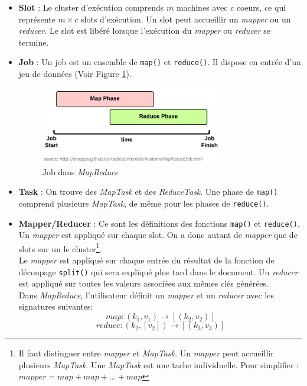 \begin{itemize}
\item {\bf Slot} : Le cluster d'exécution comprends $m$ machines avec $c$ coeurs, ce qui représente $m\times c$ slots d'exécution.
Un slot peut accueillir un {\it mapper} ou un {\it reducer}. Le slot est libéré lorsque l'exécution du {\it mapper} ou {\it reducer} se termine.
\item {\bf Job}  : Un job est un ensemble de {\tt map()} et {\tt reduce()}. Il dispose en entrée d'un jeu de données (Voir Figure \ref{fig:job}).
\begin{figure}[H]
  \centering
    \includegraphics[width=0.75\textwidth]{images/job_timeline.png} 
        \caption{Job dans {\it MapReduce}}
    
\label{fig:job}
\end{figure}
\item {\bf Task} : On trouve des {\it MapTask} et des {\it ReduceTask}. Une phase de {\tt map()} comprend plusieurs {\it MapTask}, de même pour les phases de {\tt reduce()}.

\item {\bf Mapper/Reducer} : Ce sont les définitions des fonctions {\tt map()} et {\tt reduce()}. Un {\it mapper} est appliqué sur chaque slot. On a donc autant de {\it mapper} que de slots sur un le cluster\footnote{Il faut distinguer entre {\it mapper} et {\it MapTask}. Un {\it mapper} peut accueillir plusieurs {\it MapTask}. Une {\it MapTask} est une tache individuelle. Pour simplifier : $mapper = map+map+\ldots+map$}.\\
Le {\it mapper} est appliqué sur chaque entrée du résultat de la fonction de découpage {\tt split()} qui sera expliqué plus tard dans le document.  
Un {\it reducer} est appliqué sur toutes les valeurs associées aux mêmes clés générées.\\

Dans {\it MapReduce}, l'utilisateur définit un {\it mapper} et un {\it reducer} avec les signatures suivantes\cite{mapReduceTextProcessing}:
$$map: (k_1,v_1) \rightarrow [(k_2,v_2)]$$
$$reduce:(k_2,[v_2]) \rightarrow [(k_3,v_3)]$$
\end{itemize}

